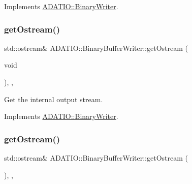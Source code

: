 Implements \mbox{\hyperlink{classADATIO_1_1BinaryWriter_a4fe227341d17d012bb83a070c208dac0}{A\+D\+A\+T\+I\+O\+::\+Binary\+Writer}}.

\mbox{\label{classADATIO_1_1BinaryBufferWriter_a587ce48f0cf6dd4064edde6db836c0a3}} 
\subsubsection{\texorpdfstring{getOstream()}{getOstream()}\hspace{0.1cm}{\footnotesize\ttfamily [2/3]}}
{\footnotesize\ttfamily std\+::ostream\& A\+D\+A\+T\+I\+O\+::\+Binary\+Buffer\+Writer\+::get\+Ostream (\begin{DoxyParamCaption}\item[{void}]{ }\end{DoxyParamCaption})\hspace{0.3cm}{\ttfamily [inline]}, {\ttfamily [protected]}, {\ttfamily [virtual]}}



Get the internal output stream. 



Implements \mbox{\hyperlink{classADATIO_1_1BinaryWriter_a4fe227341d17d012bb83a070c208dac0}{A\+D\+A\+T\+I\+O\+::\+Binary\+Writer}}.

\mbox{\label{classADATIO_1_1BinaryBufferWriter_a587ce48f0cf6dd4064edde6db836c0a3}} 
\subsubsection{\texorpdfstring{getOstream()}{getOstream()}\hspace{0.1cm}{\footnotesize\ttfamily [3/3]}}
{\footnotesize\ttfamily std\+::ostream\& A\+D\+A\+T\+I\+O\+::\+Binary\+Buffer\+Writer\+::get\+Ostream (\begin{DoxyParamCaption}{ }\end{DoxyParamCaption})\hspace{0.3cm}{\ttfamily [inline]}, {\ttfamily [protected]}, {\ttfamily [virtual]}}



